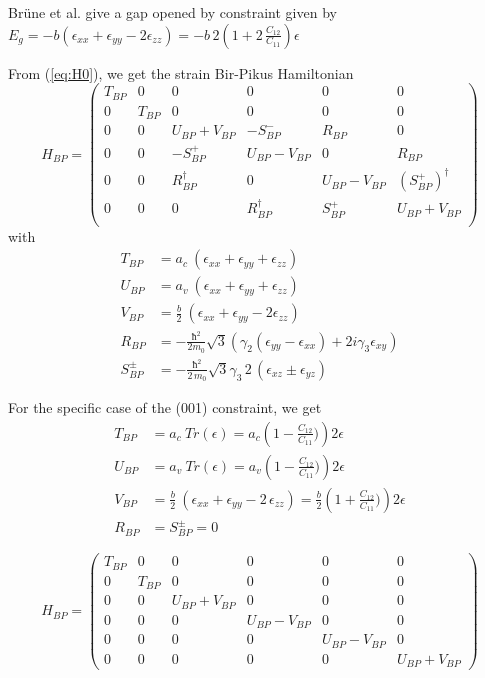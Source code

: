 \documentclass[prb,aps]{revtex4}
\begin{document}
		Brüne et al. give a gap opened by constraint given by
		$E_g = -b (ϵ_{xx} + ϵ_{yy} - 2 ϵ_{zz} )  = -b\,2\left(1 + 2\,\frac{C_{12}}{C_{11}}\right) ϵ$

		From (\ref{eq:H0}), we get the strain Bir-Pikus Hamiltonian
		\begin{equation}
			\label{eq:H-BP}
			H_{BP}=
			\begin{pmatrix}
				T_{BP} & 0 & 0 &0 &0 &0     \\
				0 & T_{BP} & 0 & 0 &0 &0   \\
				0 & 0 & U_{BP}+V_{BP} & -S^-_{BP} & R_{BP} & 0  \\
				0 & 0 & - S_{BP}^+ & U_{BP}-V_{BP} & 0& R_{BP} \\
				0& 0 & R_{BP}^\dagger & 0 & U_{BP}-V_{BP} & (S_{BP}^+)^\dagger \\
				0 & 0 & 0 & R_{BP}^\dagger & S_{BP}^+ & U_{BP}+V_{BP}  \\
			\end{pmatrix}
		\end{equation}
		with
		\begin{align}
			T_{BP} &=  a_c~ \left(  ϵ_{xx} + ϵ_{yy} + ϵ_{zz}  \right)  \\
			U_{BP} &= a_v~ \left(  ϵ_{xx} + ϵ_{yy} + ϵ_{zz}  \right)   \\
			V_{BP} &= \frac{b}{2}~ \left(  ϵ_{xx} + ϵ_{yy} -2  ϵ_{zz}  \right)  \\
			R_{BP} &= - \frac{ħ^2 }{2m_0} \sqrt{3} \left( γ_2( ϵ_{yy} - ϵ_{xx}) + 2 i γ_3  ϵ_{xy} \right) \\
			S^\pm_{BP} &= - \frac{ħ^2 }{2\,m_0} \sqrt{3} γ_3\,2\,(ϵ_{xz} \pm ϵ_{yz} )
		\end{align}

		For the specific case of the (001) constraint, we get
		\begin{align}
			T_{BP} &= a_c~ Tr(ϵ) = a_c \left( 1-\frac{C_{12}}{C_{11}}) \right) 2 ϵ  \\
			U_{BP} &= a_v~ Tr(ϵ) = a_v \left( 1-\frac{C_{12}}{C_{11}}) \right) 2 ϵ    \\
			V_{BP} &= \frac{b}{2}~ \left( ϵ_{xx} + ϵ_{yy} - 2\,ϵ_{zz} \right) = \frac{b}{2}   \left( 1+\frac{C_{12}}{C_{11}})   \right) 2 ϵ   \\
			R_{BP} &= S^\pm_{BP} =0
		\end{align}

		\begin{equation}
			\label{eq:H-BP2}
			H_{BP}=
			\begin{pmatrix}
				T_{BP} & 0 & 0 &0 &0 &0     \\
				0 & T_{BP} & 0 & 0 &0 &0   \\
				0 & 0 & U_{BP}+V_{BP} & 0& 0 & 0  \\
				0 & 0 &0 & U_{BP}-V_{BP} & 0 & 0  \\
				0& 0 & 0& 0 & U_{BP}-V_{BP} &0 \\
				0 & 0 & 0 & 0 & 0 & U_{BP}+V_{BP}
			\end{pmatrix}
		\end{equation}
\end{document}
